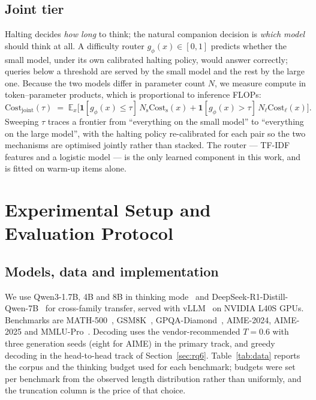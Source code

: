 \documentclass[acmsmall]{acmart}
\theoremstyle{acmdefinition}%
\theoremstyle{acmplain}}{}%
\begin{document}
\subsection{Joint tier}
Halting decides \emph{how long} to think; the natural companion decision is \emph{which model} should think at all. A difficulty router $g_\phi(x)\in[0,1]$ predicts whether the small model, under its own calibrated halting policy, would answer correctly; queries below a threshold are served by the small model and the rest by the large one. Because the two models differ in parameter count $N$, we measure compute in token--parameter products, which is proportional to inference FLOPs:
\begin{equation}
\mathrm{Cost}_{\text{joint}}(\tau) \;=\; \mathbb{E}_x\Big[ \mathbf{1}[g_\phi(x) \le \tau]\, N_{\mathrm{s}}\mathrm{Cost}_{\mathrm{s}}(x) + \mathbf{1}[g_\phi(x) > \tau]\, N_{\ell}\mathrm{Cost}_{\ell}(x) \Big].
\label{eq:joint}
\end{equation}
Sweeping $\tau$ traces a frontier from ``everything on the small model'' to ``everything on the large model'', with the halting policy re-calibrated for each pair so the two mechanisms are optimised jointly rather than stacked. The router --- TF-IDF features and a logistic model --- is the only learned component in this work, and is fitted on warm-up items alone.

\section{Experimental Setup and Evaluation Protocol}\label{sec:protocol}

\subsection{Models, data and implementation}
We use Qwen3-1.7B, 4B and 8B in thinking mode~\cite{yang2025qwen3} and DeepSeek-R1-Distill-Qwen-7B~\cite{deepseekai2025r1} for cross-family transfer, served with vLLM~\cite{kwon2023efficient} on NVIDIA L40S GPUs. Benchmarks are MATH-500~\cite{hendrycks2021measuring,lightman2024lets}, GSM8K~\cite{cobbe2021training}, GPQA-Diamond~\cite{rein2024gpqa}, AIME-2024, AIME-2025 and MMLU-Pro~\cite{wang2024mmlupro}. Decoding uses the vendor-recommended $T=0.6$ with three generation seeds (eight for AIME) in the primary track, and greedy decoding in the head-to-head track of Section~\ref{sec:rq6}. Table~\ref{tab:data} reports the corpus and the thinking budget used for each benchmark; budgets were set per benchmark from the observed length distribution rather than uniformly, and the truncation column is the price of that choice.
\end{document}
